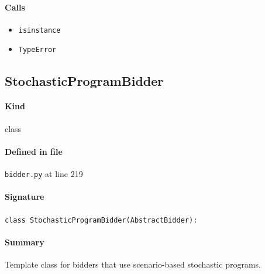 \documentclass[11pt]{report}
\begin{document}
\paragraph{Calls}
\begin{itemize}[leftmargin=*]
  \item \texttt{isinstance}
  \item \texttt{TypeError}
\end{itemize}
\subsection{StochasticProgramBidder}
\label{def:bidder.py:StochasticProgramBidder:L219}
\paragraph{Kind} class
\paragraph{Defined in file} \texttt{bidder.py} at line 219
\paragraph{Signature} \texttt{class StochasticProgramBidder(AbstractBidder):}
\paragraph{Summary} Template class for bidders that use scenario-based stochastic programs.
\end{document}
